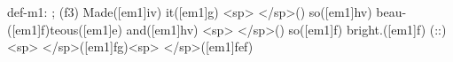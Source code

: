 def-m1: \grealign;
(f3) Made([em1]iv) it([em1]g) <sp> </sp>() so([em1]hv) beau-([em1]f)teous([em1]e) and([em1]hv) <sp> </sp>() so([em1]f) bright.([em1]f) (::) <sp> </sp>([em1]fg)<sp>   </sp>([em1]fef)
